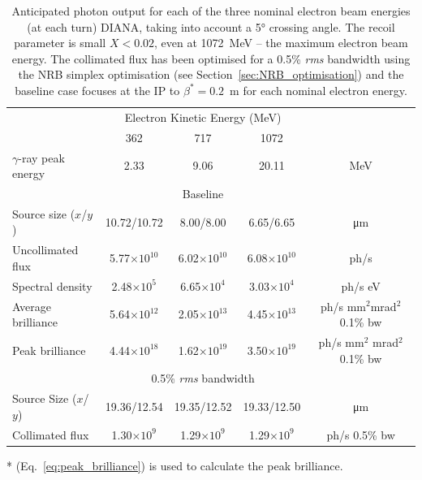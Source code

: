 \documentclass[../main.tex]{subfiles}
\begin{document}
\begin{table}[!h]
\caption{Anticipated photon output for each of the three nominal electron beam energies (at each turn) DIANA, taking into account a 5\si{\degree} crossing angle. The recoil parameter is small $X < 0.02$, even at 1072~\si{\mega\electronvolt} -- the maximum electron beam energy. The collimated flux has been optimised for a 0.5\% \textit{rms} bandwidth using the NRB simplex optimisation (see Section~\ref{sec:NRB_optimisation}) and the baseline case focuses at the IP to $\beta^{*} =0.2$~\si{\meter} for each nominal electron energy.}
\vspace{3mm}
\centering
\begin{threeparttable}
\begin{tabular}{lcccc}
\hline\hline
 & \multicolumn{3}{c}{Electron Kinetic Energy (\si{\mega\electronvolt})} & \\
 \cline{2-4}
 & 362 & 717 & 1072 & \\
\hline
$\gamma$-ray peak energy  & 2.33 & 9.06 & 20.11 & \si{\mega\electronvolt}\\
\hline
 & \multicolumn{3}{c}{Baseline} & \\
\hline
Source size ($x$/$y$)  & 10.72/10.72 & 8.00/8.00 & 6.65/6.65 & \si{\micro\meter} \\
Uncollimated flux  & 5.77$\times 10^{10}$ & 6.02$\times 10^{10}$ & 6.08$\times 10^{10}$ & ph/\si{\second}\\
Spectral density  & 2.48$\times 10^{5}$ & 6.65$\times 10^{4}$ & 3.03$\times 10^{4}$ & ph/\si{\second} \si{\electronvolt}\\
Average brilliance  & 5.64$\times 10^{12}$ & 2.05$\times 10^{13}$ & 4.45$\times 10^{13}$ & ph/\si{\second} \si{\milli\meter}$^{2}$\si{\milli\radian}$^{2}$ 0.1\% bw\\
Peak brilliance\tnote{*}  & 4.44$\times 10^{18}$ & 1.62$\times 10^{19}$ & 3.50$\times 10^{19}$ & ph/\si{\second} \si{\milli\meter}$^{2}$ \si{\milli\radian}$^{2}$ 0.1\% bw\\
\hline
 & \multicolumn{3}{c}{0.5\% \textit{rms} bandwidth} & \\
\hline
Source Size ($x$/$y$) & 19.36/12.54 & 19.35/12.52 & 19.33/12.50 & \si{\micro\meter} \\ 
Collimated flux  & 1.30$\times 10^{9}$ & 1.29$\times 10^{9}$ & 1.29$\times 10^{9}$ & ph/\si{\second} 0.5\% bw \\
\hline\hline
\end{tabular}
\begin{tablenotes}
\item[*]{(Eq.~\ref{eq:peak_brilliance}) is used to calculate the peak brilliance.}
\end{tablenotes}
\end{threeparttable}
\label{tab:DIANA_spectral_output}
\end{table}
\end{document}

